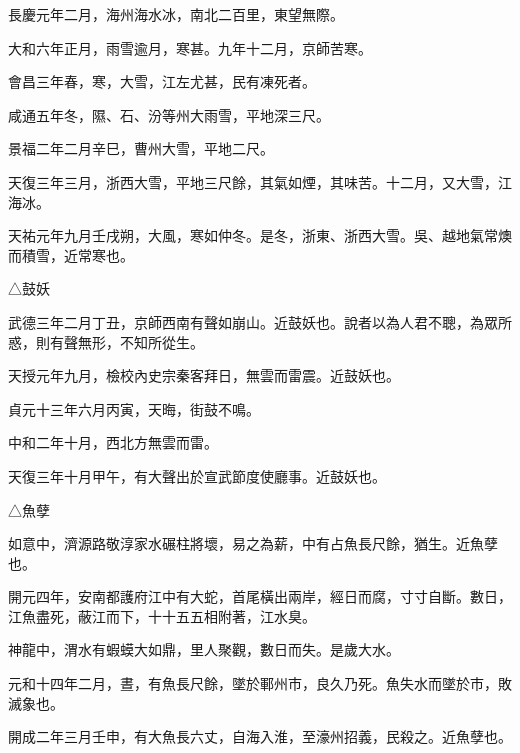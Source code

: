 \begin{pinyinscope}
 長慶元年二月，海州海水冰，南北二百里，東望無際。



 大和六年正月，雨雪逾月，寒甚。九年十二月，京師苦寒。



 會昌三年春，寒，大雪，江左尤甚，民有凍死者。



 咸通五年冬，隰、石、汾等州大雨雪，平地深三尺。



 景福二年二月辛巳，曹州大雪，平地二尺。



 天復三年三月，浙西大雪，平地三尺餘，其氣如煙，其味苦。十二月，又大雪，江海冰。



 天祐元年九月壬戌朔，大風，寒如仲冬。是冬，浙東、浙西大雪。吳、越地氣常燠而積雪，近常寒也。



 △鼓妖



 武德三年二月丁丑，京師西南有聲如崩山。近鼓妖也。說者以為人君不聰，為眾所惑，則有聲無形，不知所從生。



 天授元年九月，檢校內史宗秦客拜日，無雲而雷震。近鼓妖也。



 貞元十三年六月丙寅，天晦，街鼓不鳴。



 中和二年十月，西北方無雲而雷。



 天復三年十月甲午，有大聲出於宣武節度使廳事。近鼓妖也。



 △魚孽



 如意中，濟源路敬淳家水碾柱將壞，易之為薪，中有占魚長尺餘，猶生。近魚孽也。



 開元四年，安南都護府江中有大蛇，首尾橫出兩岸，經日而腐，寸寸自斷。數日，江魚盡死，蔽江而下，十十五五相附著，江水臭。



 神龍中，渭水有蝦蟆大如鼎，里人聚觀，數日而失。是歲大水。



 元和十四年二月，晝，有魚長尺餘，墜於鄆州市，良久乃死。魚失水而墜於市，敗滅象也。



 開成二年三月壬申，有大魚長六丈，自海入淮，至濠州招義，民殺之。近魚孽也。




\end{pinyinscope}
